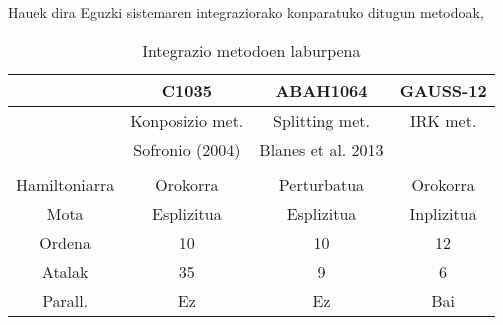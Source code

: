 Hauek dira Eguzki sistemaren integraziorako konparatuko ditugun metodoak,

\begin{table}[H]
\caption{Integrazio metodoen laburpena}
\label{tab:1}       %
\begin{tabular}{ c|c c c } 
           &  C1035             &  ABAH1064           & GAUSS-12           \\
 \hline
 	       & Konposizio met.    & Splitting met.     & IRK met.            \\
 	       & Sofronio (2004)    & Blanes et al. 2013 &                     \\
 \hline 
               &                    &                    &                 \\
 Hamiltoniarra & Orokorra           & Perturbatua        & Orokorra        \\ 	    
 Mota          & Esplizitua         & Esplizitua         & Inplizitua      \\ 
 Ordena        & 10                 & 10                 & 12              \\ 
 Atalak        & 35                 & 9                  & 6               \\ 
 Parall.       & Ez                 & Ez                 & Bai             \\  
\end{tabular}
\end{table}
 
